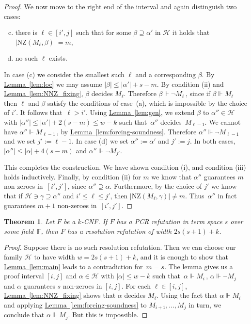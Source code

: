 \documentclass[11pt]{article}
\numberwithin{equation}{section}
\newtheorem{theorem}{Theorem}[section]
\theoremstyle{definition}
\theoremstyle{plain}
\newcommand{\expref}[2]{\hyperref[#2]{#1~\ref{#2}}}
\newcommand\calH{\mathcal{H}}
\newcommand\bbF{\mathbb{F}}
\newcommand\rmNZ{\mathrm{NZ}}
\begin{document}
\begin{proof}
We now move to the right end of the interval and 
again distinguish two cases:
\begin{enumerate}[(a)]\setcounter{enumi}{2}
\item there is $\ell \in [i',j]$ such that for some $\beta \supseteq \alpha'$ 
in $\calH$ it holds that $|\rmNZ(M_\ell, \beta)| = m$,
\item no such $\ell$ exists.
\end{enumerate}
In case (c) we consider the smallest such $\ell$ and a corresponding $\beta$.
By \expref{Lemma}{lem:loc} we may assume $|\beta| \le |\alpha'|+s-m$.
By condition (ii) and \expref{Lemma}{lem:NNZ_fixing}, $\beta$ decides $M_{\ell}$.
Therefore $\beta \Vdash \neg M_{\ell}$\,, since if 
$\beta \Vdash M_{\ell}$ then $\ell$ and $\beta$ satisfy the conditions
of case~(a), which is impossible by the choice of $i'$.
It follows that~$\ell > i'$. 
Using \expref{Lemma}{lem:gen}, we extend $\beta$
to $\alpha'' \in \calH$ with $|\alpha''| \le |\alpha'| + 2(s-m) \le w-k$ 
such that~$\alpha''$ decides~$M_{\ell - 1}$.
We cannot have $\alpha'' \Vdash M_{\ell-1}$\,, by \expref{Lemma}{lem:forcing-soundness}. 
Therefore $\alpha'' \Vdash \neg M_{\ell-1}$
and we set $j' := \ell -1$.
In case (d) we set $\alpha'' :=\alpha'$ and  $j' := j$. 
In both cases, $|\alpha''| \le |\alpha| + 4(s-m)$ and $\alpha'' \Vdash \neg M_{j'}$.


This completes the construction. We have shown condition (i),
and condition (iii) holds inductively. 
Finally, by condition (ii) for $m$ we know that $\alpha''$
guarantees $m$ non-zeroes in~$[i',j']$, since $\alpha'' \supseteq \alpha$.
Furthermore,
by the choice of $j'$ we know that if $\calH \ni \gamma \supseteq \alpha''$ and $i' \le \ell \le j'$, then
$|\rmNZ(M_{\ell}, \gamma)| \neq m$. 
Thus~$\alpha''$ in fact guarantees $m+1$ non-zeroes in~$[i',j']$.
\end{proof}



\begin{theorem} \label{thm:first}
Let $F$ be a $k$-CNF. If $F$ has a PCR refutation in term
space $s$ 
over some field~$\bbF$, 
then $F$ has a resolution refutation of width $2s(s+1)+k$. 
\end{theorem}

\begin{proof}
Suppose there is no such resolution refutation. Then 
we can choose our family $\calH$ to have width $w=2s(s+1)+k$,
and it is enough to show that \expref{Lemma}{lem:main} leads to a contradiction
for~$m=s$. The lemma gives us 
a proof interval $[i, j]$
and $\alpha \in \calH$
with $|\alpha| \le w-k$ such that~$\alpha \Vdash M_i$\,, $\alpha \Vdash \neg M_j$
and $\alpha$ guarantees $s$ non-zeroes in $[i,j]$. 
For each $\ell \in[i, j]$,
\expref{Lemma}{lem:NNZ_fixing} 
shows that
$\alpha$ decides $M_\ell$. Using the fact that $\alpha \Vdash M_i$ and applying \expref{Lemma}{lem:forcing-soundness} to $M_{i+1}, \dots, M_j$ in turn, 
we conclude that $\alpha \Vdash M_j$. But this is impossible.
\end{proof}
\end{document}
